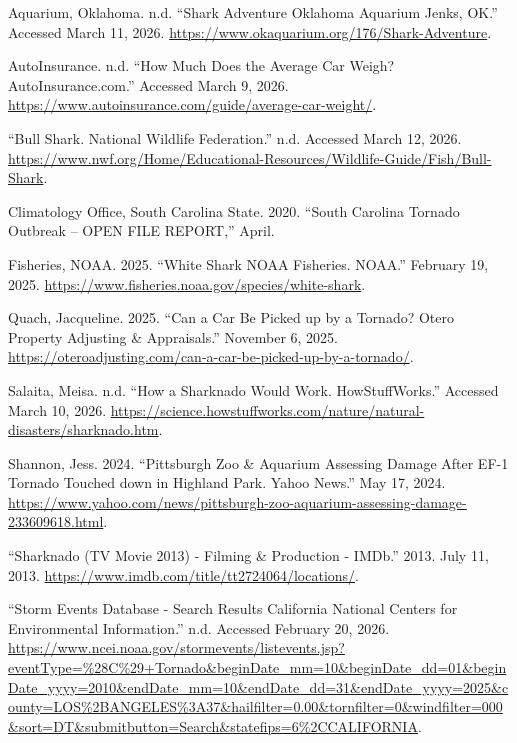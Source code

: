 \documentclass[
  letterpaper,
  DIV=11,
  numbers=noendperiod]{scrreprt}
\newlength{\cslhangindent}
\newenvironment{CSLReferences}[2] %
 {\begin{list}{}{%
  \setlength{\itemindent}{0pt}
  \setlength{\leftmargin}{0pt}
  \setlength{\parsep}{0pt}
  \ifodd #1
   \setlength{\leftmargin}{\cslhangindent}
   \setlength{\itemindent}{-1\cslhangindent}
  \fi
  \setlength{\itemsep}{#2\baselineskip}}}
 {\end{list}}
\begin{document}
\label{refs}
\begin{CSLReferences}{1}{0}
Aquarium, Oklahoma. n.d. {``Shark Adventure {\textbar} Oklahoma Aquarium
Jenks, {OK}.''} Accessed March 11, 2026.
\url{https://www.okaquarium.org/176/Shark-Adventure}.

AutoInsurance. n.d. {``How Much Does the Average Car Weigh?
{AutoInsurance}.com.''} Accessed March 9, 2026.
\url{https://www.autoinsurance.com/guide/average-car-weight/}.

{``Bull Shark. National Wildlife Federation.''} n.d. Accessed March 12,
2026.
\url{https://www.nwf.org/Home/Educational-Resources/Wildlife-Guide/Fish/Bull-Shark}.

Climatology Office, South Carolina State. 2020. {``South Carolina
Tornado Outbreak -- {OPEN} {FILE} {REPORT},''} April.

Fisheries, NOAA. 2025. {``White Shark {\textbar} {NOAA} Fisheries.
{NOAA}.''} February 19, 2025.
\url{https://www.fisheries.noaa.gov/species/white-shark}.

Quach, Jacqueline. 2025. {``Can a Car Be Picked up by a Tornado?
{\textbar} Otero Property Adjusting \& Appraisals.''} November 6, 2025.
\url{https://oteroadjusting.com/can-a-car-be-picked-up-by-a-tornado/}.

Salaita, Meisa. n.d. {``How a Sharknado Would Work. {HowStuffWorks}.''}
Accessed March 10, 2026.
\url{https://science.howstuffworks.com/nature/natural-disasters/sharknado.htm}.

Shannon, Jess. 2024. {``Pittsburgh Zoo \& Aquarium Assessing Damage
After {EF}-1 Tornado Touched down in Highland Park. Yahoo News.''} May
17, 2024.
\url{https://www.yahoo.com/news/pittsburgh-zoo-aquarium-assessing-damage-233609618.html}.

{``Sharknado ({TV} Movie 2013) - Filming \& Production - {IMDb}.''}
2013. July 11, 2013.
\url{https://www.imdb.com/title/tt2724064/locations/}.

{``Storm Events Database - Search Results California National Centers
for Environmental Information.''} n.d. Accessed February 20, 2026.
\url{https://www.ncei.noaa.gov/stormevents/listevents.jsp?eventType=\%28C\%29+Tornado&beginDate_mm=10&beginDate_dd=01&beginDate_yyyy=2010&endDate_mm=10&endDate_dd=31&endDate_yyyy=2025&county=LOS\%2BANGELES\%3A37&hailfilter=0.00&tornfilter=0&windfilter=000&sort=DT&submitbutton=Search&statefips=6\%2CCALIFORNIA}.


\end{CSLReferences}
\end{document}
